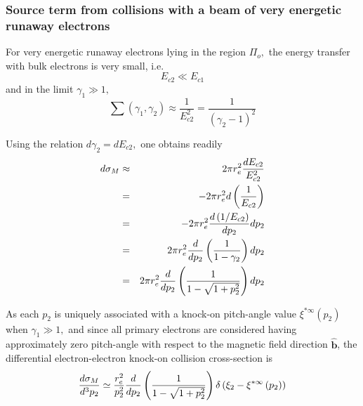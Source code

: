 \subsubsection{Source term from collisions with a beam of very energetic
runaway electrons}

For very energetic runaway electrons lying in the region $\Pi _{o},$ the
energy transfer with bulk electrons is very small, i.e. 
\begin{equation}
E_{c2}\ll E_{c1}
\end{equation}%
and in the limit $\gamma _{1}\gg 1,$ 
\begin{equation}
\sum \left( \gamma _{1},\gamma _{2}\right) \approx \frac{1}{E_{c2}^{2}}=%
\frac{1}{\left( \gamma _{2}-1\right) ^{2}}
\end{equation}

Using the relation $d\gamma _{2}=dE_{c2},$ one obtains readily 
\begin{eqnarray}
d\sigma _{M} &\approx &2\pi r_{e}^{2}\frac{dE_{c2}}{E_{c2}^{2}}  \notag \\
&=&-2\pi r_{e}^{2}d\left( \frac{1}{E_{c2}}\right)  \notag \\
&=&-2\pi r_{e}^{2}\frac{d\left( 1/E_{c2}\right) }{dp_{2}}dp_{2}  \notag \\
&=&2\pi r_{e}^{2}\frac{d}{dp_{2}}\left( \frac{1}{1-\gamma _{2}}\right) dp_{2}
\notag \\
&=&2\pi r_{e}^{2}\frac{d}{dp_{2}}\left( \frac{1}{1-\sqrt{1+p_{2}^{2}}}%
\right) dp_{2}
\end{eqnarray}

As each $p_{2}$ is uniquely associated with a knock-on pitch-angle value $%
\xi ^{\ast \infty }\left( p_{2}\right) $ when $\gamma _{1}\gg 1,$ and since
all primary electrons are considered having approximately zero pitch-angle
with respect to the magnetic field direction $\widehat{\mathbf{b}}$, the
differential electron-electron knock-on collision cross-section is 
\begin{equation}
\frac{d\sigma _{M}}{d^{3}p_{2}}\simeq \frac{r_{e}^{2}}{p_{2}^{2}}\frac{d}{%
dp_{2}}\left( \frac{1}{1-\sqrt{1+p_{2}^{2}}}\right) \delta \left( \xi
_{2}-\xi ^{\ast \infty }\left( p_{2}\right) \right) 
\end{equation}


